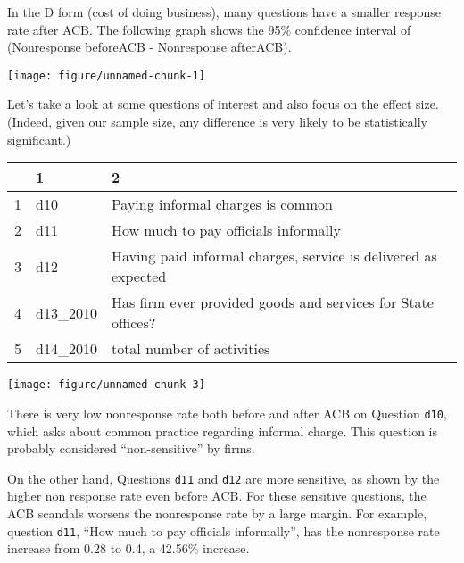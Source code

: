 \documentclass{article}\usepackage[]{graphicx}\usepackage[]{color}
\makeatletter
\def\maxwidth{ %
  \ifdim\Gin@nat@width>\linewidth
    \linewidth
  \else
    \Gin@nat@width
  \fi
}
\newenvironment{knitrout}{}{} %
\makeatother
\begin{document}
In the D form (cost of doing business), many questions have a smaller response rate after ACB. The following graph shows the 95\% confidence interval of (Nonresponse beforeACB - Nonresponse afterACB).

\begin{knitrout}
\color{fgcolor}

{\centering \texttt{[image: figure/unnamed-chunk-1]} 

}



\end{knitrout}

Let's take a look at some questions of interest and also focus on the effect size. (Indeed, given our sample size, any difference is very likely to be statistically significant.)

\begin{table}[ht]
\centering
\begin{tabular}{rll}
  \hline
 & 1 & 2 \\ 
  \hline
1 & d10 & Paying informal charges is common \\ 
  2 & d11 & How much to pay officials informally \\ 
  3 & d12 & Having paid informal charges, service is delivered as expected \\ 
  4 & d13\_2010 & Has firm ever provided goods and services for State offices? \\ 
  5 & d14\_2010 & total number of activities \\ 
   \hline
\end{tabular}
\end{table}


\begin{knitrout}
\color{fgcolor}

{\centering \texttt{[image: figure/unnamed-chunk-3]} 

}



\end{knitrout}

There is very low nonresponse rate both before and after ACB on Question \verb`d10`, which asks about common practice regarding informal charge. This question is probably considered ``non-sensitive'' by firms. 

On the other hand, Questions \verb`d11` and \verb`d12` are more sensitive, as shown by the higher non response rate even before ACB. For these sensitive questions, the ACB scandals worsens the nonresponse rate by a large margin. For example, question \verb`d11`, ``How much to pay officials informally'', has the nonresponse rate increase from 0.28 to 0.4, a 42.56\% increase.
\end{document}
